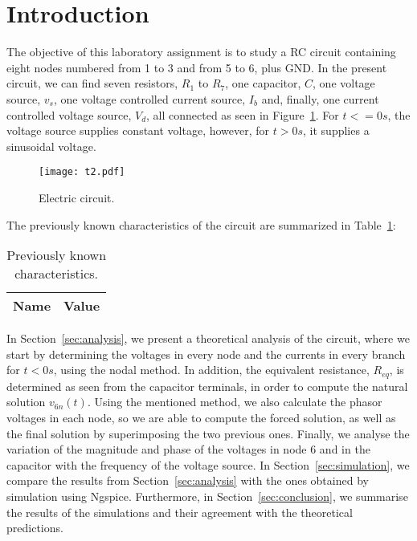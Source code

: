\section{Introduction}
\label{sec:introduction}

The objective of this laboratory assignment is to study a RC circuit containing eight nodes numbered from 1 to 3 and from 5 to 6, plus GND. In the present circuit, we can find seven resistors, $R_1$ to $R_7$, one capacitor, $C$, one voltage source, $v_s$, one voltage controlled current source, $I_b$ and, finally, one current controlled voltage source, $V_d$, all connected as seen in Figure~\ref{fig:t1}. For $t <= 0s$, the voltage source supplies constant voltage, however, for $t > 0s$, it supplies a sinusoidal voltage.

\begin{figure}[H] \centering
\texttt{[image: t2.pdf]}
\caption{Electric circuit.}
\label{fig:t1}
\end{figure}

The previously known characteristics of the circuit are summarized in Table~\ref{tab:datatab}:

\begin{table}[H]
  \centering
  \begin{tabular}{|l|r|}
    \hline    
    {\bf Name} & {\bf Value} \\ \hline
    
  \end{tabular}
  \caption{Previously known characteristics.}
  \label{tab:datatab}
\end{table}

In Section~\ref{sec:analysis}, we present a theoretical analysis of the circuit, where we start by determining the voltages in every node and the currents in every branch for $t<0s$, using the nodal method. In addition, the equivalent resistance, $R_{eq}$, is determined as seen from the capacitor terminals, in order to compute the natural solution $v_{6n}(t)$. Using the mentioned method, we also calculate the phasor voltages in each node, so we are able to compute the forced solution, as well as the final solution by superimposing the two previous ones. Finally, we analyse the variation of the magnitude and phase of the voltages in node 6 and in the capacitor with the frequency of the voltage source. In Section~\ref{sec:simulation}, we compare the results from Section~\ref{sec:analysis} with the ones obtained by simulation using Ngspice. Furthermore, in Section~\ref{sec:conclusion}, we summarise the results of the simulations and their agreement with the theoretical predictions.
